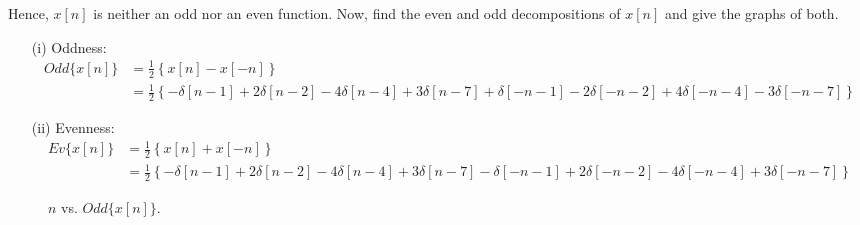 \documentclass[10pt,a4paper, margin=1in]{article}
\begin{document}
\begin{enumerate}
Hence, $x[n]$ is neither an odd nor an even function. Now, find the even and odd decompositions of $x[n]$ and give the graphs of both.
	\begin{itemize}
		\item[(i)] Oddness:
			\begin{equation}
			\begin{split}
				Odd\{x[n]\} & = \frac{1}{2} \left\{ x[n] - x[-n] \right\}\\
				& = \frac{1}{2} \left\{ -\delta[n - 1] + 2\delta[n - 2] -4\delta[n-4] + 3\delta[n-7] + \delta[-n - 1] - 2\delta[-n - 2] + 4\delta[-n-4] - 3\delta[-n-7] \right\}
			\end{split}
			\end{equation}
		\item[(ii)] Evenness:
			\begin{equation}
			\begin{split}
				Ev\{x[n]\} & = \frac{1}{2} \left\{ x[n] + x[-n] \right\}\\
				& = \frac{1}{2} \left\{ -\delta[n - 1] + 2\delta[n - 2] -4\delta[n-4] + 3\delta[n-7] - \delta[-n - 1] + 2\delta[-n - 2] - 4\delta[-n-4] + 3\delta[-n-7] \right\}
			\end{split}
			\end{equation}
	\end{itemize}





\begin{figure} [H]
    \centering
    \caption{$n$ vs. $Odd\{x[n]\}$.}
    \label{fig:q5}
\end{figure}


\end{enumerate}
\end{document}
